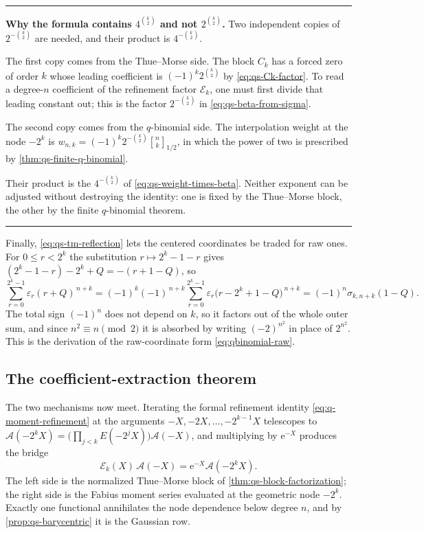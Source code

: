 \documentclass[11pt,oneside]{article}
\theoremstyle{definition}
\theoremstyle{remark}
\newcommand{\e}{\mathrm e}
\newcommand{\qbinom}[3]{\genfrac{[}{]}{0pt}{}{#1}{#2}_{#3}}
\newenvironment{boxedremark}{%
  \par\smallskip\noindent\begin{center}\begin{minipage}{0.94\textwidth}%
  \color{black}\hrule\vspace{0.6em}\small
}{%
  \vspace{0.6em}\hrule\end{minipage}\end{center}\smallskip
}
\begin{document}
\begin{boxedremark}
\textbf{Why the formula contains $4^{\binom k2}$ and not $2^{\binom k2}$.}
Two independent copies of $2^{-\binom k2}$ are needed, and their product is
$4^{-\binom k2}$.

The first copy comes from the Thue--Morse side.  The block $C_k$ has a forced zero of order
$k$ whose leading coefficient is $(-1)^k2^{\binom k2}$ by \eqref{eq:qs-Ck-factor}.  To read a
degree-$n$ coefficient of the refinement factor $\mathscr E_k$, one must first divide that
leading constant out; this is the factor $2^{-\binom k2}$ in
\eqref{eq:qs-beta-from-sigma}.

The second copy comes from the $q$-binomial side.  The interpolation weight at the node
$-2^k$ is $w_{n,k}=(-1)^k2^{-\binom k2}\qbinom nk{1/2}$, in which the power of two is
prescribed by \cref{thm:qs-finite-q-binomial}.

Their product is the $4^{-\binom k2}$ of \eqref{eq:qs-weight-times-beta}.  Neither exponent
can be adjusted without destroying the identity: one is fixed by the Thue--Morse block, the
other by the finite $q$-binomial theorem.
\end{boxedremark}

Finally, \eqref{eq:qs-tm-reflection} lets the centered coordinates be traded for raw ones.
For $0\le r<2^k$ the substitution $r\mapsto2^k-1-r$ gives
$(2^k-1-r)-2^k+Q=-(r+1-Q)$, so
\begin{equation}
 \sum_{r=0}^{2^k-1}\varepsilon_r(r+Q)^{\,n+k}
 =(-1)^{k}(-1)^{\,n+k}\sum_{r=0}^{2^k-1}\varepsilon_r\bigl(r-2^k+1-Q\bigr)^{\,n+k}
 =(-1)^n\sigma_{k,n+k}(1-Q).                              \label{eq:qs-reflection-sum}
\end{equation}
The total sign $(-1)^n$ does not depend on $k$, so it factors out of the whole outer sum, and
since $n^2\equiv n\pmod2$ it is absorbed by writing $(-2)^{n^2}$ in place of $2^{n^2}$.  This
is the derivation of the raw-coordinate form \eqref{eq:qbinomial-raw}.

\subsection{The coefficient-extraction theorem}
\label{subsec:qs-extraction}

The two mechanisms now meet.  Iterating the formal refinement identity
\eqref{eq:q-moment-refinement} at the arguments $-X,-2X,\ldots,-2^{k-1}X$ telescopes to
$\mathscr A(-2^kX)=\bigl(\prod_{j<k}E(-2^jX)\bigr)\mathscr A(-X)$, and multiplying by
$\e^{-X}$ produces the bridge
\begin{equation}
 \mathscr E_k(X)\,\mathscr A(-X)=\e^{-X}\mathscr A(-2^kX). \label{eq:qs-bridge}
\end{equation}
The left side is the normalized Thue--Morse block of \cref{thm:qs-block-factorization}; the
right side is the Fabius moment series evaluated at the geometric node $-2^k$.  Exactly one
functional annihilates the node dependence below degree $n$, and by
\cref{prop:qs-barycentric} it is the Gaussian row.
\end{document}
